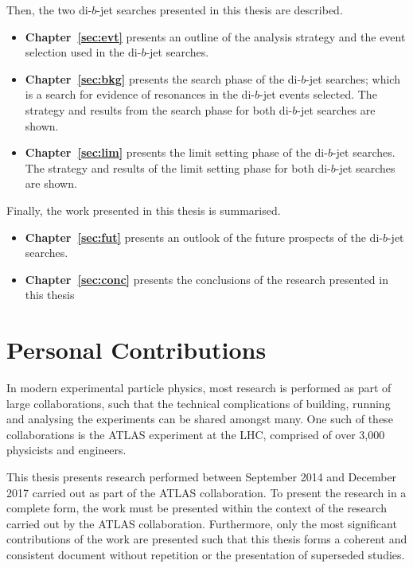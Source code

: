 \noindent
Then, the two di-$b$-jet searches presented in this thesis are described. %
\vspace{-0.5em}
\begin{itemize}[leftmargin=*]
\item\textbf{Chapter~\ref{sec:evt}} presents an outline of the analysis strategy and the event selection used in the \mbox{di-$b$-jet} searches.%
\item\textbf{Chapter~\ref{sec:bkg}} presents the search phase of the di-$b$-jet searches;
  which is a search for evidence of resonances in the di-$b$-jet events selected.
  The strategy and results from the search phase for both di-$b$-jet searches are shown.%
\item\textbf{Chapter~\ref{sec:lim}} presents the limit setting phase of the di-$b$-jet searches.
  The strategy and results of the limit setting phase for both di-$b$-jet searches are shown.%
\end{itemize}

\noindent
Finally, the work presented in this thesis is summarised.
\vspace{-0.5em}
  \begin{itemize}[leftmargin=*]
\item\textbf{Chapter~\ref{sec:fut}} presents an outlook of the future prospects of the di-$b$-jet searches.%
\item\textbf{Chapter~\ref{sec:conc}} presents the conclusions of the research presented in this thesis%
\end{itemize}
\clearpage
\section{Personal Contributions}

In modern experimental particle physics, most research is performed as part of large collaborations,
such that the technical complications of building, running and analysing the experiments can be shared amongst many.
One such of these collaborations is the ATLAS experiment at the LHC, comprised of over 3,000 physicists and engineers.

This thesis presents research performed between September 2014 and December 2017 carried out as part of the ATLAS collaboration.
To present the research in a complete form, the work must be presented within the context of the research carried out by the ATLAS collaboration.
Furthermore, only the most significant contributions of the work are presented
such that this thesis forms a coherent and consistent document without repetition or the presentation of superseded studies.

